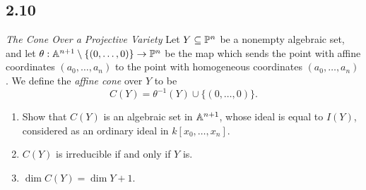 \subsection*{2.10}

\textit{The Cone Over a Projective Variety} Let $Y \subseteq \P^n$ be a nonempty algebraic set, and let $\theta: \A^{n+1} \setminus \{(0, \ldots, 0)\} \to \P^n$ be the map which sends the point with affine coordinates $(a_0, \ldots, a_n)$ to the point with homogeneous coordinates $(a_0, \ldots, a_n)$. We define the \textit{affine cone} over $Y$ to be
$$C(Y) = \theta^{-1}(Y) \cup \{(0, \ldots, 0)\}.$$

\begin{enumerate}
    \item Show that $C(Y)$ is an algebraic set in $\A^{n+1}$, whose ideal is equal to $I(Y)$, considered as an ordinary ideal in $k[x_0, \ldots, x_n]$.
    \item $C(Y)$ is irreducible if and only if $Y$ is.
    \item $\dim C(Y) = \dim Y + 1$.
\end{enumerate}
